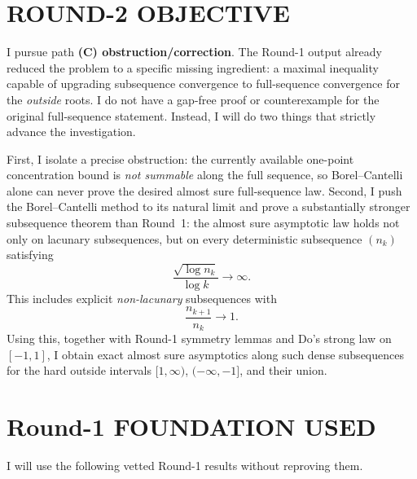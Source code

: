 \section{ROUND-2 OBJECTIVE}

I pursue path \textbf{(C) obstruction/correction}. The Round-1 output already reduced the problem to a specific missing ingredient: a maximal inequality capable of upgrading subsequence convergence to full-sequence convergence for the \emph{outside} roots. I do not have a gap-free proof or counterexample for the original full-sequence statement. Instead, I will do two things that strictly advance the investigation.

First, I isolate a precise obstruction: the currently available one-point concentration bound is \emph{not summable} along the full sequence, so Borel--Cantelli alone can never prove the desired almost sure full-sequence law. Second, I push the Borel--Cantelli method to its natural limit and prove a substantially stronger subsequence theorem than Round~1: the almost sure asymptotic law holds not only on lacunary subsequences, but on every deterministic subsequence $(n_k)$ satisfying
\[
\frac{\sqrt{\log n_k}}{\log k}\to\infty.
\]
This includes explicit \emph{non-lacunary} subsequences with
\[
\frac{n_{k+1}}{n_k}\to 1.
\]
Using this, together with Round-1 symmetry lemmas and Do's strong law on $[-1,1]$, I obtain exact almost sure asymptotics along such dense subsequences for the hard outside intervals $[1,\infty)$, $(-\infty,-1]$, and their union.

\section{Round-1 FOUNDATION USED}

I will use the following vetted Round-1 results without reproving them.

